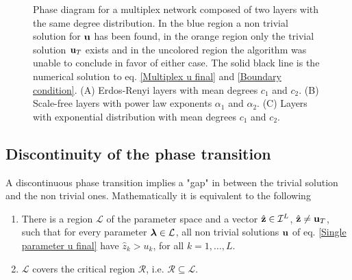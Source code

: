 \documentclass[
11pt, %
english, %
singlespacing, %
nolistspacing, %
liststotoc, %
headsepline, %
]{MastersDoctoralThesis} %
\begin{document}
{\begin{figure}
	\caption{Phase diagram for a multiplex network composed of two layers with the same degree distribution. In the blue region a non trivial solution for $\boldsymbol{\mathrm{u}}$ has been found, in the orange region only the trivial solution $\boldsymbol{\mathrm{u}}_T$ exists and in the uncolored region the algorithm was unable to conclude in favor of either case. The solid black line is the numerical solution to eq. \eqref{Multiplex u final} and \eqref{Boundary condition}. (A) Erdos-Renyi layers with mean degrees $c_1$ and $c_2$. (B) Scale-free layers with power law exponents $\alpha_1$ and $\alpha_2$. (C) Layers with exponential distribution with mean degrees $c_1$ and $c_2$.}
	\label{Figure: Regions and boundary}
\end{figure}
}

\subsection{Discontinuity of the phase transition}
\label{Section: Discontinuous phase transition}

A discontinuous phase transition implies a "gap" in between the trivial solution and the non trivial ones. Mathematically it is equivalent to the following
\begin{enumerate}
	\item There is a region $\mathcal{L}$ of the parameter space and a vector $\hat{\boldsymbol{\mathrm{z}}} \in \mathcal{I}^L$, $\hat{\boldsymbol{\mathrm{z}}} \neq \boldsymbol{\mathrm{u}}_T$, such that for every parameter $\boldsymbol{\mathrm{\lambda}} \in \mathcal{L}$, all non trivial solutions $\boldsymbol{\mathrm{u}}$ of eq. \eqref{Single parameter u final} have $\hat{z}_k > u_k$, for all $k = 1, \dots, L$.
	\item $\mathcal{L}$ covers the critical region $\mathcal{R}$, i.e. $\mathcal{R} \subseteq \mathcal{L}$.
\end{enumerate}
\end{document}
